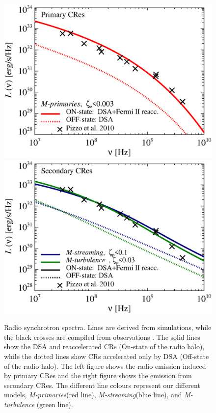 \documentclass[fleqn,usenatbib,useAMS]{mnras}
\newcommand{\Mstream}{{\it M-streaming}\xspace}
\newcommand{\Mflatturb}{{\it M-turbulence}\xspace}
\newcommand{\Mprimary}{{\it M-primaries}\xspace}
\begin{document}
\begin{figure}
  \includegraphics[width=1.0\columnwidth]{sync.spec.pri.g72a.140.v6.eps}
  \includegraphics[width=1.0\columnwidth]{sync.spec.sec.g72a.140.v6.eps}
  \caption{Radio synchrotron spectra. Lines are derived from
    simulations, while the black crosses are compiled from
    observations \citet{2010PhDT.......259P}. The solid lines show the
    DSA and reaccelerated CRs (On-state of the radio halo), while the
    dotted lines show CRs accelerated only by DSA (Off-state of the
    radio halo). The left figure shows the radio emission induced by
    primary CRes and the right figure shows the emission from
    secondary CRes. The different line colours represent our different
    models, \Mprimary (red line), \Mstream (blue line), and \Mflatturb
    (green line).}
  \label{fig:sync_spectrum}
\end{figure}
\end{document}
